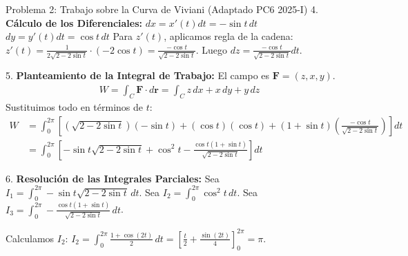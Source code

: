\documentclass[11pt,a4paper]{article}
\begin{document}
\begin{ejerciciobox}{Problema 2: Trabajo sobre la Curva de Viviani (Adaptado PC6 2025-I)}
4. \textbf{Cálculo de los Diferenciales:}
$dx = x'(t)dt = -\sin t \, dt$
$dy = y'(t)dt = \cos t \, dt$
Para $z'(t)$, aplicamos regla de la cadena:
$z'(t) = \frac{1}{2\sqrt{2 - 2\sin t}} \cdot (-2\cos t) = \frac{-\cos t}{\sqrt{2 - 2\sin t}}$.
Luego $dz = \frac{-\cos t}{\sqrt{2 - 2\sin t}} dt$.

5. \textbf{Planteamiento de la Integral de Trabajo:}
El campo es $\mathbf{F} = (z, x, y)$.
\begin{align*}
W = \int_C \mathbf{F} \cdot d\mathbf{r} = \int_C z \, dx + x \, dy + y \, dz
\end{align*}
Sustituimos todo en términos de $t$:
\begin{align*}
W &= \int_0^{2\pi} \left[ \left(\sqrt{2-2\sin t}\right)(-\sin t) + (\cos t)(\cos t) + (1+\sin t)\left(\frac{-\cos t}{\sqrt{2-2\sin t}}\right) \right] dt \\
&= \int_0^{2\pi} \left[ -\sin t \sqrt{2-2\sin t} + \cos^2 t - \frac{\cos t(1+\sin t)}{\sqrt{2-2\sin t}} \right] dt
\end{align*}

6. \textbf{Resolución de las Integrales Parciales:}
Sea $I_1 = \int_0^{2\pi} -\sin t \sqrt{2-2\sin t} \, dt$.
Sea $I_2 = \int_0^{2\pi} \cos^2 t \, dt$.
Sea $I_3 = \int_0^{2\pi} - \frac{\cos t(1+\sin t)}{\sqrt{2-2\sin t}} \, dt$.

Calculamos $I_2$:
$I_2 = \int_0^{2\pi} \frac{1+\cos(2t)}{2} \, dt = \left[ \frac{t}{2} + \frac{\sin(2t)}{4} \right]_0^{2\pi} = \pi$.


\end{ejerciciobox}
\end{document}
